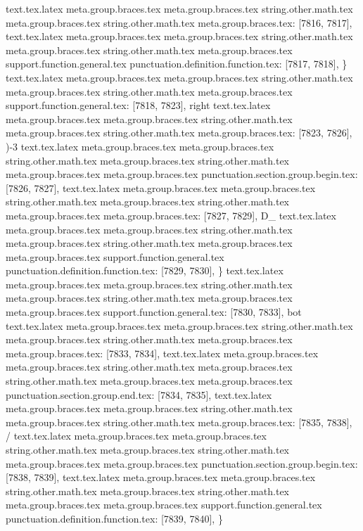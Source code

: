 {{{{{{{{{{{{{{{{{{{{{{{{{{{{{{{{{{{{{{{{{{{{{{{{{{{{{{{{{{{{{{{{{{{{{{{{{{{{{{{{{{{{{{{{{{{{{{{{{{{{{{{{{{{{{{{{{{{{{{{{{{{{{{{{{{{{{{{{{{{{{{{{{{{{{{{{{{{{{{{{{{{{{{{{{{{{{{{{{{{{{{{{{{{{{{{{{{{{{{{{{{{{{{{{{{{{{{{{{{{{{{{{{{{{{{text.tex.latex meta.group.braces.tex meta.group.braces.tex string.other.math.tex meta.group.braces.tex string.other.math.tex meta.group.braces.tex: [7816, 7817], { }
text.tex.latex meta.group.braces.tex meta.group.braces.tex string.other.math.tex meta.group.braces.tex string.other.math.tex meta.group.braces.tex support.function.general.tex punctuation.definition.function.tex: [7817, 7818], {\}
text.tex.latex meta.group.braces.tex meta.group.braces.tex string.other.math.tex meta.group.braces.tex string.other.math.tex meta.group.braces.tex support.function.general.tex: [7818, 7823], {right}
text.tex.latex meta.group.braces.tex meta.group.braces.tex string.other.math.tex meta.group.braces.tex string.other.math.tex meta.group.braces.tex: [7823, 7826], {)-3}
text.tex.latex meta.group.braces.tex meta.group.braces.tex string.other.math.tex meta.group.braces.tex string.other.math.tex meta.group.braces.tex meta.group.braces.tex punctuation.section.group.begin.tex: [7826, 7827], {{}
text.tex.latex meta.group.braces.tex meta.group.braces.tex string.other.math.tex meta.group.braces.tex string.other.math.tex meta.group.braces.tex meta.group.braces.tex: [7827, 7829], {D_}
text.tex.latex meta.group.braces.tex meta.group.braces.tex string.other.math.tex meta.group.braces.tex string.other.math.tex meta.group.braces.tex meta.group.braces.tex support.function.general.tex punctuation.definition.function.tex: [7829, 7830], {\}
text.tex.latex meta.group.braces.tex meta.group.braces.tex string.other.math.tex meta.group.braces.tex string.other.math.tex meta.group.braces.tex meta.group.braces.tex support.function.general.tex: [7830, 7833], {bot}
text.tex.latex meta.group.braces.tex meta.group.braces.tex string.other.math.tex meta.group.braces.tex string.other.math.tex meta.group.braces.tex meta.group.braces.tex: [7833, 7834], { }
text.tex.latex meta.group.braces.tex meta.group.braces.tex string.other.math.tex meta.group.braces.tex string.other.math.tex meta.group.braces.tex meta.group.braces.tex punctuation.section.group.end.tex: [7834, 7835], {}}
text.tex.latex meta.group.braces.tex meta.group.braces.tex string.other.math.tex meta.group.braces.tex string.other.math.tex meta.group.braces.tex: [7835, 7838], { / }
text.tex.latex meta.group.braces.tex meta.group.braces.tex string.other.math.tex meta.group.braces.tex string.other.math.tex meta.group.braces.tex meta.group.braces.tex punctuation.section.group.begin.tex: [7838, 7839], {{}
text.tex.latex meta.group.braces.tex meta.group.braces.tex string.other.math.tex meta.group.braces.tex string.other.math.tex meta.group.braces.tex meta.group.braces.tex support.function.general.tex punctuation.definition.function.tex: [7839, 7840], {\}
}}}}}}}}}}}}}}}}}}}}}}}}}}}}}}}}}}}}}}}}}}}}}}}}}}}}}}}}}}}}}}}}}}}}}}}}}}}}}}}}}}}}}}}}}}}}}}}}}}}}}}}}}}}}}}}}}}}}}}}}}}}}}}}}}}}}}}}}}}}}}}}}}}}}}}}}}}}}}}}}}}}}}}}}}}}}}}}}}}}}}}}}}}}}}}}}}}}}}}}}}}}}}}}}}}}}}}}}}}}}}}}}}}}}}}}}}}
